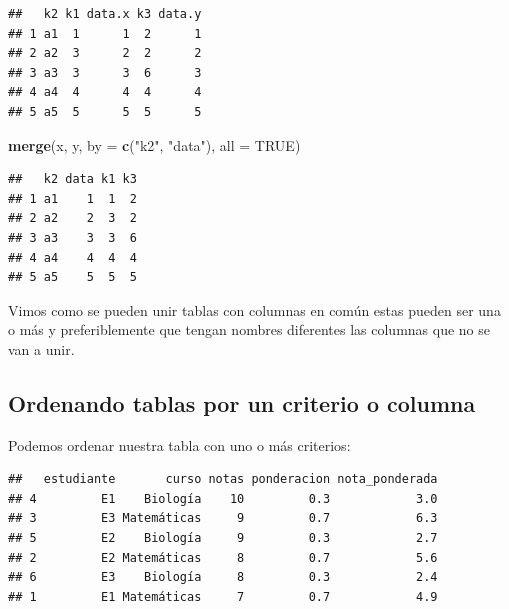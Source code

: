 \documentclass[
]{book}
\newenvironment{Shaded}{\begin{snugshade}}{\end{snugshade}}
\newcommand{\AttributeTok}[1]{\textcolor[rgb]{0.13,0.29,0.53}{#1}}
\newcommand{\ConstantTok}[1]{\textcolor[rgb]{0.56,0.35,0.01}{#1}}
\newcommand{\FunctionTok}[1]{\textcolor[rgb]{0.13,0.29,0.53}{\textbf{#1}}}
\newcommand{\NormalTok}[1]{#1}
\newcommand{\OtherTok}[1]{\textcolor[rgb]{0.56,0.35,0.01}{#1}}
\newcommand{\SpecialCharTok}[1]{\textcolor[rgb]{0.81,0.36,0.00}{\textbf{#1}}}
\newcommand{\StringTok}[1]{\textcolor[rgb]{0.31,0.60,0.02}{#1}}
\begin{document}
\begin{verbatim}
##   k2 k1 data.x k3 data.y
## 1 a1  1      1  2      1
## 2 a2  3      2  2      2
## 3 a3  3      3  6      3
## 4 a4  4      4  4      4
## 5 a5  5      5  5      5
\end{verbatim}

\begin{Shaded}
\begin{Highlighting}[]
\FunctionTok{merge}\NormalTok{(x, y, }\AttributeTok{by =} \FunctionTok{c}\NormalTok{(}\StringTok{"k2"}\NormalTok{, }\StringTok{"data"}\NormalTok{), }\AttributeTok{all =} \ConstantTok{TRUE}\NormalTok{) }
\end{Highlighting}
\end{Shaded}

\begin{verbatim}
##   k2 data k1 k3
## 1 a1    1  1  2
## 2 a2    2  3  2
## 3 a3    3  3  6
## 4 a4    4  4  4
## 5 a5    5  5  5
\end{verbatim}

Vimos como se pueden unir tablas con columnas en común estas pueden ser una o más y preferiblemente que tengan nombres diferentes las columnas que no se van a unir.

\subsection{Ordenando tablas por un criterio o columna}\label{ordenando-tablas-por-un-criterio-o-columna}

Podemos ordenar nuestra tabla con uno o más criterios:

\begin{Shaded}
\end{Shaded}

\begin{verbatim}
##   estudiante       curso notas ponderacion nota_ponderada
## 4         E1    Biología    10         0.3            3.0
## 3         E3 Matemáticas     9         0.7            6.3
## 5         E2    Biología     9         0.3            2.7
## 2         E2 Matemáticas     8         0.7            5.6
## 6         E3    Biología     8         0.3            2.4
## 1         E1 Matemáticas     7         0.7            4.9
\end{verbatim}
\end{document}
